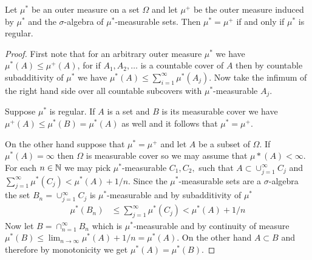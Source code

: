 \begin{prop}\label{InducedOuterMeasureFromRegularOuterMeasure}Let $\mu^*$ be an outer measure on a set $\Omega$ and let $\mu^+$ be the outer measure induced by $\mu^*$ and the 
$\sigma$-algebra of $\mu^*$-measurable sets.  Then $\mu^* = \mu^+$ if and only if $\mu^*$ is regular.
\end{prop}
\begin{proof}
First note that for an arbitrary outer measure $\mu^*$ we have $\mu^*(A) \leq \mu^+(A)$, for if $A_1, A_2, \dotsc$ is a countable cover of $A$ then by countable subadditivity of $\mu^*$ we have
$\mu^*(A) \leq \sum_{i=1}^\infty \mu^*(A_j)$.  Now take the infimum of the right hand side over all countable subcovers with $\mu^*$-measurable $A_j$.

Suppose $\mu^*$ is regular. If $A$ is a set and $B$ is its measurable cover we have $\mu^+(A) \leq \mu^*(B) = \mu^*(A)$ as well and it follows that $\mu^*=\mu^+$.

On the other hand suppose that $\mu^* = \mu^+$ and let $A$ be a subset of $\Omega$.  If $\mu^*(A) = \infty$ then $\Omega$ is measurable cover so we may assume that $\mu*(A) < \infty$.  
For each $n \in \mathbb{N}$ we may pick $\mu^*$-measurable $C_1, C_2, $ such that $A \subset \cup_{j=1}^\infty C_j$ and $\sum_{j=1}^\infty \mu^*(C_j) < \mu^*(A) + 1/n$.  Since the $\mu^*$-measurable sets are a $\sigma$-algebra the set $B_n = \cup_{j=1}^\infty C_j$ is $\mu^*$-measurable and by subadditivity of $\mu^*$
\begin{align*}
\mu^*(B_n) &\leq \sum_{j=1}^\infty \mu^*(C_j) < \mu^*(A) + 1/n
\end{align*}
Now let $B = \cap_{n=1}^\infty B_n$ which is $\mu^*$-measurable and by continuity of measure $\mu^*(B) \leq \lim_{n \to \infty} \mu^*(A) + 1/n = \mu^*(A)$.  On the other hand $A \subset B$ and
therefore by monotonicity we get $\mu^*(A) = \mu^*(B)$.
\end{proof}

